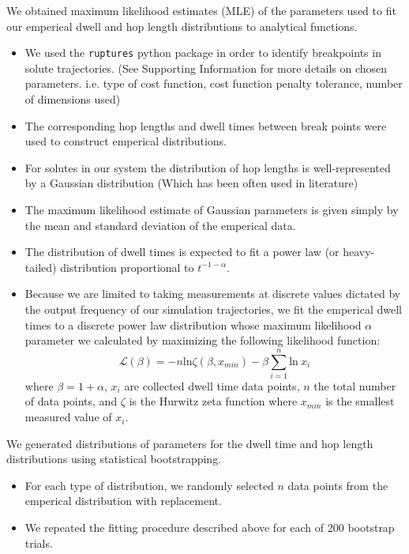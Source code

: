 \documentclass{article}
\begin{document}
  We obtained maximum likelihood estimates (MLE) of the parameters used to fit our
  emperical dwell and hop length distributions to analytical functions.
  \begin{itemize}
	\item We used the \texttt{ruptures} python package in order to identify
	breakpoints in solute trajectories. (See Supporting Information for more
	details on chosen parameters. i.e. type of cost function, cost function penalty
	tolerance, number of dimensions used)
	\item The corresponding hop lengths and dwell times between break points were 
	used to construct emperical distributions.
	\item For solutes in our system the distribution of hop lengths is
	well-represented by a Gaussian distribution (Which has been often used in
	literature)
	\item The maximum likelihood estimate of Gaussian parameters is given simply
	by the mean and standard deviation of the emperical data.
	~\cite{metzler_random_2000,metzler_anomalous_2014,neusius_subdiffusion_2009} 
	\item The distribution of dwell	times is expected to fit a power law (or heavy-tailed)
	distribution proportional to $t^{-1-\alpha}$.~\cite{meroz_toolbox_2015}
	\item Because we are limited to taking measurements at discrete values
	dictated by the output frequency of our simulation trajectories, we fit the
	emperical dwell times to a discrete power law distribution whose maximum
	likelihood $\alpha$ parameter we calculated by maximizing the following
	likelihood function: 
        \begin{equation}
	\mathcal{L}(\beta) = -n\text{ln}\zeta(\beta, x_{min}) -
	\beta\sum_{i=1}^{n} \text{ln}~x_i 
	\label{eqn:powelaw_likelihood}
	\end{equation}
	where $\beta = 1 + \alpha$, $x_i$ are collected dwell time data points,
	$n$ the total number of data points, and $\zeta$ is the Hurwitz zeta function
	where $x_{min}$ is the smallest measured value of
	$x_i$.~\cite{clauset_power-law_2009} 
  \end{itemize}

  We generated distributions of parameters for the dwell time and hop length
  distributions using statistical bootstrapping.
  \begin{itemize}
	\item For each type of distribution, we randomly selected $n$ data points from the emperical
	distribution with replacement.
	\item We repeated the fitting procedure described above for each of 200 bootstrap trials.
  \end{itemize} 
\end{document}
